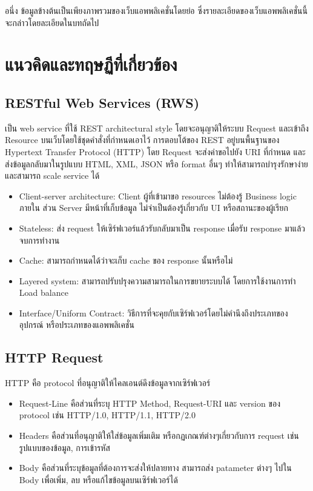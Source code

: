 อนึ่ง ข้อมูลข้างต้นเป็นเพียงภาพรวมของเว็บแอพพลิเคชั่นโดยย่อ ซึ่งรายละเอียดของเว็บแอพพลิเคชั่นนี้จะกล่าวโดยละเอียดในบทถัดไป

\section{แนวคิดและทฤษฏีที่เกี่ยวข้อง}

\subsection{RESTful Web Services (RWS)}

เป็น web service ที่ใช้ REST architectural style โดยจะอนุญาติให้ระบบ Request และเข้าถึง Resource บนเว็บโดยใช้ชุดคำสั่งที่กำหนดเอาไว้  การตอบโต้ของ REST อยู่บนพื้นฐานของ Hypertext Transfer Protocol (HTTP) โดย Request จะส่งคำขอไปยัง URI ที่กำหนด และส่งข้อมูลกลับมาในรูปแบบ HTML, XML, JSON หรือ format อื่นๆ ทำให้สามารถบำรุงรักษาง่าย และสามารถ scale service ได้~\cite{Guru99}

\begin{itemize}
  \item Client-server architecture: Client ผู้ที่เข้ามาขอ resources ไม่ต้องรู้ Business logic ภายใน ส่วน Server มีหน้าที่เก็บข้อมูล ไม่จำเป็นต้องรู้เกี่ยวกับ UI หรือสถานะของผู้เรียก
  \item Stateless: ส่ง request ให้เซิร์ฟเวอร์แล้วรับกลับมาเป็น response เมื่อรับ response มาแล้วจบการทำงาน
  \item Cache: สามารถกำหนดได้ว่าจะเก็บ cache ของ response นั้นหรือไม่
  \item Layered system: สามารถปรับปรุงความสามารถในการขยายระบบได้ โดยการใช้งานการทำ Load balance
  \item Interface/Uniform Contract: วิธีการที่จะคุยกับเซิร์ฟเวอร์โดยไม่คำนึงถึงประเภทของอุปกรณ์ หรือประเภทของแอพพลิเคชั่น
\end{itemize}

\subsection{HTTP Request}

HTTP คือ protocol ที่อนุญาติให้ไคลเอนต์ดึงข้อมูลจากเซิร์ฟเวอร์~\cite{Guru99}

\begin{itemize}
  \item Request-Line คือส่วนที่ระบุ HTTP Method, Request-URI และ version ของ protocol เช่น HTTP/1.0, HTTP/1.1, HTTP/2.0
  \item Headers คือส่วนที่อนุญาติให้ใส่ข้อมูลเพิ่มเติม หรือกฏเกณฑ์ต่างๆเกี่ยวกับการ request เช่น รูปแบบของข้อมูล, การเข้ารหัส
  \item Body คือส่วนที่ระบุข้อมูลที่ต้องการจะส่งให้ปลายทาง สามารถส่ง patameter ต่างๆ ไปใน Body เพื่อเพิ่ม, ลบ หรือแก้ไขข้อมูลบนเซิร์ฟเวอร์ได้
\end{itemize}


